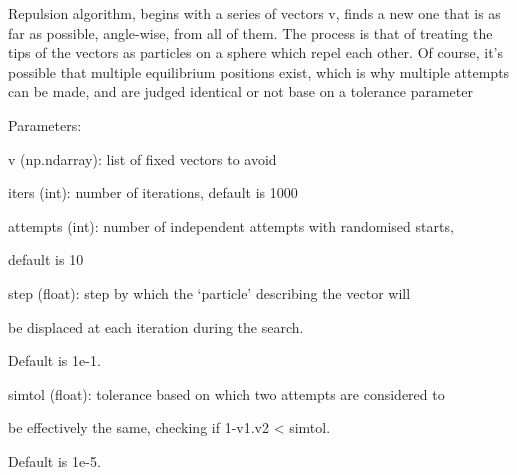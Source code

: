 \documentclass[letterpaper,10pt,english]{sphinxmanual}
\begin{document}
\begin{fulllineitems}
\label{doctree/soprano.utils:soprano.utils.rep_alg}
Repulsion algorithm, begins with a series of vectors v, finds a new one
that is as far as possible, angle-wise, from all of them.
The process is that of treating the tips of the vectors as particles on a
sphere which repel each other. Of course, it's possible that multiple
equilibrium positions exist, which is why multiple attempts can be made,
and are judged identical or not base on a tolerance parameter

\begin{DUlineblock}{0em}
\item[] Parameters:
\item[]
\begin{DUlineblock}{\DUlineblockindent}
\item[] v (np.ndarray): list of fixed vectors to avoid
\item[] iters (int): number of iterations, default is 1000
\item[] attempts (int): number of independent attempts with randomised starts,
\item[]
\begin{DUlineblock}{\DUlineblockindent}
\item[] default is 10
\end{DUlineblock}
\item[] step (float): step by which the `particle' describing the vector will
\item[]
\begin{DUlineblock}{\DUlineblockindent}
\item[] be displaced at each iteration during the search.
\item[] Default is 1e-1.
\end{DUlineblock}
\item[] simtol (float): tolerance based on which two attempts are considered to
\item[]
\begin{DUlineblock}{\DUlineblockindent}
\item[] be effectively the same, checking if 1-v1.v2 \textless{} simtol.
\item[] Default is 1e-5.
\end{DUlineblock}
\end{DUlineblock}
\end{DUlineblock}


\end{fulllineitems}
\end{document}
